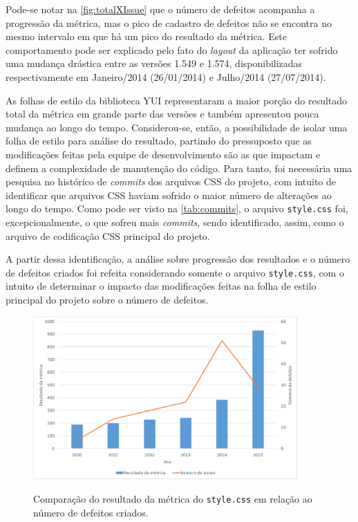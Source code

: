 Pode-se notar na \autoref{fig:totalXIssue} que o número de defeitos acompanha a progressão da métrica, mas o pico de cadastro de defeitos não se encontra no mesmo intervalo em que há um pico do resultado da métrica. Este comportamento pode ser explicado pelo fato do \textit{layout} da aplicação ter sofrido uma mudança drástica entre as versões 1.549 e 1.574, disponibilizadas respectivamente em Janeiro/2014 (26/01/2014) e Julho/2014 (27/07/2014).

As folhas de estilo da biblioteca YUI representaram a maior porção do resultado total da métrica em grande parte das versões e também apresentou pouca mudança ao longo do tempo. Considerou-se, então, a possibilidade de isolar uma folha de estilo para análise do resultado, partindo do pressuposto que as modificações feitas pela equipe de desenvolvimento são as que impactam e definem a complexidade de manutenção do código. Para tanto, foi necessária uma pesquisa no histórico de \textit{commits} dos arquivos CSS do projeto, com intuito de identificar que arquivos CSS haviam sofrido o maior número de alterações ao longo do tempo. Como pode ser visto na \autoref{tab:commits}, o arquivo \texttt{style.css} foi, excepcionalmente, o que sofreu mais \textit{commits}, sendo identificado, assim, como o arquivo de codificação CSS principal do projeto.



A partir dessa identificação, a análise sobre progressão dos resultados e o número de defeitos criados foi refeita considerando somente o arquivo \texttt{style.css}, com o intuito de determinar o impacto das modificações feitas na folha de estilo principal do projeto sobre o número de defeitos.

\begin{figure}[!htb]
	\centering
	\caption{Comparação do resultado da métrica do \texttt{style.css} em relação ao número de defeitos criados.}
	\includegraphics[width=0.9\textwidth]{./04-figuras/style_issues}
	\label{fig:styleXIssues}
\end{figure}

